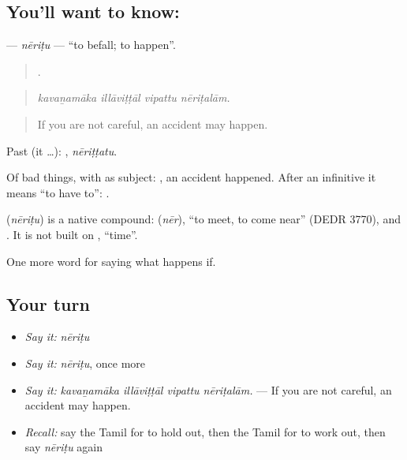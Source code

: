\subsection*{You'll want to know: }
\textbf{} — \emph{nēriṭu} — \textquotedblleft{}to befall; to happen\textquotedblright{}.

\begin{quote}
   .
\end{quote}

\begin{quote}
\emph{kavaṉamāka illāviṭṭāl vipattu nēriṭalām.}
\end{quote}

\begin{quote}
If you are not careful, an accident may happen.
\end{quote}

Past (it …): , \emph{nēriṭṭatu}.

Of bad things, with  as subject:  , an accident happened. After an infinitive it means \textquotedblleft{}to have to\textquotedblright{}:  .

\begin{cousinweb}
\textbf{} (\emph{nēriṭu}) is a native compound:  (\emph{nēr}), \textquotedblleft{}to meet, to come near\textquotedblright{} (DEDR 3770), and . It is not built on , \textquotedblleft{}time\textquotedblright{}.
\end{cousinweb}

\begin{grammarlens}[title={What you've built}]
One more word for saying what happens if.
\end{grammarlens}

\subsection*{Your turn}
\begin{itemize}
\raggedright
  \item \emph{Say it:} \emph{nēriṭu}
  \item \emph{Say it:} \emph{nēriṭu}, once more
  \item \emph{Say it:} \emph{kavaṉamāka illāviṭṭāl vipattu nēriṭalām.} — If you are not careful, an accident may happen.
  \item \emph{Recall:} say the Tamil for to hold out, then the Tamil for to work out, then say \emph{nēriṭu} again
\end{itemize}

